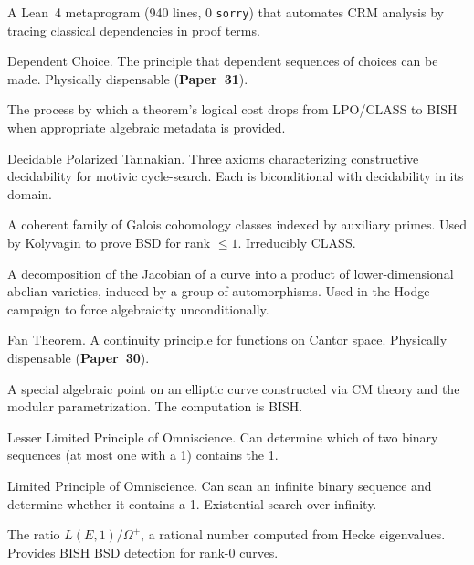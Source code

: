 \documentclass[11pt,twoside,openany]{report}
\theoremstyle{remark}
\newcommand{\BISH}{\textsf{BISH}}
\newcommand{\CLASS}{\textsf{CLASS}}
\newcommand{\paperref}[1]{\textbf{Paper~#1}}
\begin{document}
\begin{description}[style=nextline, leftmargin=2.5cm, labelwidth=2.3cm]
\item[CRMLint] A Lean~4 metaprogram (940 lines, 0 \texttt{sorry}) that automates CRM analysis by tracing classical dependencies in proof terms.

\item[DC] Dependent Choice. The principle that dependent sequences of choices can be made. Physically dispensable (\paperref{31}).

\item[De-omniscientizing descent] The process by which a theorem's logical cost drops from LPO/\CLASS{} to \BISH{} when appropriate algebraic metadata is provided.

\item[DPT] Decidable Polarized Tannakian. Three axioms characterizing constructive decidability for motivic cycle-search. Each is biconditional with decidability in its domain.

\item[Euler system] A coherent family of Galois cohomology classes indexed by auxiliary primes. Used by Kolyvagin to prove BSD for rank $\leq 1$. Irreducibly \CLASS.

\item[Kani-Rosen splitting] A decomposition of the Jacobian of a curve into a product of lower-dimensional abelian varieties, induced by a group of automorphisms. Used in the Hodge campaign to force algebraicity unconditionally.

\item[FT] Fan Theorem. A continuity principle for functions on Cantor space. Physically dispensable (\paperref{30}).

\item[Heegner point] A special algebraic point on an elliptic curve constructed via CM theory and the modular parametrization. The computation is \BISH.

\item[LLPO] Lesser Limited Principle of Omniscience. Can determine which of two binary sequences (at most one with a 1) contains the 1.

\item[LPO] Limited Principle of Omniscience. Can scan an infinite binary sequence and determine whether it contains a 1. Existential search over infinity.

\item[Modular symbol] The ratio $L(E,1)/\Omega^+$, a rational number computed from Hecke eigenvalues. Provides \BISH{} BSD detection for rank-0 curves.


\end{description}
\end{document}
